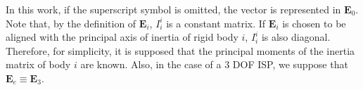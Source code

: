 In this work, if the superscript symbol is omitted, the vector is represented in $\mathbf{E}_0$.
%
Note that, by the definition of $\mathbf{E}_{i}$, $I^i_i$ is a constant matrix. If $\mathbf{E}_{i}$ is chosen to be aligned with the principal axis of inertia of rigid body $i$, $I^i_i$ is also diagonal.   Therefore,
for simplicity, it is supposed that the principal moments of the inertia matrix of body $i$ are known.
%
Also, in the case of a 3 DOF ISP, we suppose that $\mathbf{E}_{e} \equiv \mathbf{E}_{3}$.
